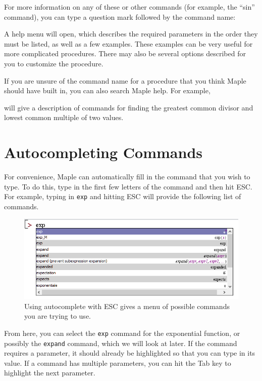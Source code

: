 
For more information on any of these or other commands (for example, the ``sin'' command), you can type a question mark followed by the command name: \begin{mapleinput}  \end{mapleinput}  
\noindent A help menu will open, which describes the required parameters in the order they must be listed, as well as a few examples. These examples can be very useful for more complicated procedures. There may also be several options described for you to customize the procedure.

If you are unsure of the command name for a procedure that you think Maple should have built in, you can also search Maple help. For example,
\begin{mapleinput}  \end{mapleinput}  
\noindent will give a description of commands for finding the greatest common divisor and lowest common multiple of two values.

\section{Autocompleting Commands}

For convenience, Maple can automatically fill in the command that you wish to type. To do this, type in the first few letters of the command  and then hit ESC. 
For example, typing in \texttt{exp} and hitting ESC will provide the following list of commands.
\begin{figure}
\centering
\includegraphics[width=\textwidth]{tutorials/figures/autocomplete.png}
\caption{Using autocomplete with ESC gives a menu of possible commands you are trying to use.}
\end{figure}
From here, you can select the \texttt{exp} command for the exponential function, or possibly the \texttt{expand} command, which we will look at later. If the command requires a parameter, it should already be highlighted so that you can type in its value. If a command has multiple parameters, you can hit the Tab key to highlight the next parameter.

